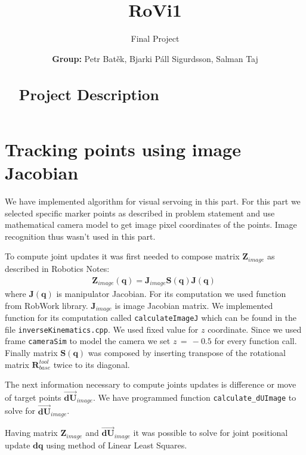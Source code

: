 \documentclass[]{scrartcl}
\title{RoVi1}
\subtitle{Final Project \vspace{2cm}}
\author{\textbf{Group:} Petr Batěk,  Bjarki Páll Sigurdsson, Salman Taj}
\begin{document}
	
	\maketitle
	
	\newpage

\begin{abstract}
\section*{Project Description}

\end{abstract}

\section{Tracking points using image Jacobian}
We have implemented algorithm for visual servoing in this part. For this part we selected specific marker points as described in problem statement and use mathematical camera model to get image pixel coordinates of the points. Image recognition thus wasn't used in this part.

To compute joint updates it was first needed to compose matrix $\boldsymbol{Z}_{image}$ as described in Robotics Notes:
\begin{align}
	\boldsymbol{Z}_{image}(\boldsymbol{q}) = \boldsymbol{J}_{image}\boldsymbol{S}(\boldsymbol{q})\boldsymbol{J}(\boldsymbol{q})\; 
\end{align}
where $\boldsymbol{J}(\boldsymbol{q})$ is manipulator Jacobian. For its computation we used function from RobWork library. $\boldsymbol{J}_{image}$ is image Jacobian matrix. We implemented function for its computation called \texttt{calculateImageJ} which can be found in the file \texttt{inverseKinematics.cpp}. We used fixed value for $z$ coordinate. Since we used frame \texttt{cameraSim} to model the camera we set $z\, = \, -0.5$ for every function call. Finally matrix $\boldsymbol{S}(\boldsymbol{q})$ was composed by inserting transpose of the rotational matrix $\boldsymbol{R}_{base}^{tool}$ twice to its diagonal.

The next information necessary to compute joints updates is difference or move of target points $\overrightarrow{\boldsymbol{dU}}_{image}$. We have programmed function \texttt{calculate\_dUImage} to solve for $\overrightarrow{\boldsymbol{dU}}_{image}$.

Having matrix $\boldsymbol{Z}_{image}$ and $\overrightarrow{\boldsymbol{dU}}_{image}$ it was possible to solve for joint positional update ${\boldsymbol{dq}}$ using method of Linear Least Squares.
\end{document}

